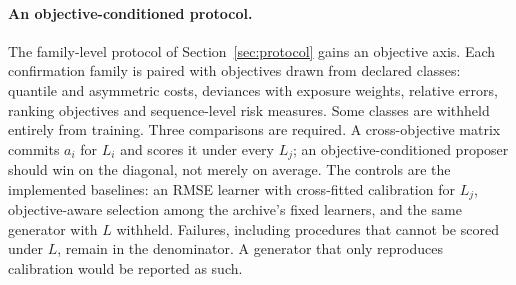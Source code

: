 \paragraph{An objective-conditioned protocol.}
The family-level protocol of Section~\ref{sec:protocol} gains an objective
axis. Each confirmation family is paired with objectives drawn from declared
classes: quantile and asymmetric costs, deviances with exposure weights,
relative errors, ranking objectives and sequence-level risk measures. Some
classes are withheld entirely from training. Three comparisons are required.
A cross-objective matrix commits $a_i$ for $L_i$ and scores it under every
$L_j$; an objective-conditioned proposer should win on the diagonal, not
merely on average. The controls are the implemented baselines: an RMSE learner
with cross-fitted calibration for $L_j$, objective-aware selection among the
archive's fixed learners, and the same generator with $L$ withheld. Failures,
including procedures that cannot be scored under $L$, remain in the
denominator. A generator that only reproduces calibration would be reported
as such.
